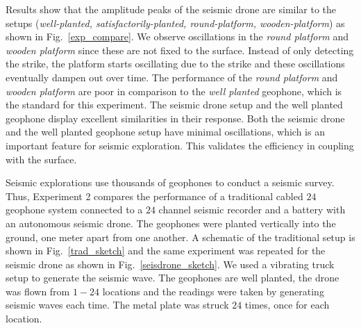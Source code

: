 Results show that the amplitude peaks of the seismic drone are similar to the setups (\emph{well-planted, satisfactorily-planted, round-platform, wooden-platform}) as shown in Fig.~\ref{exp_compare}. We observe oscillations in the \emph{round platform} and \emph{wooden platform} since these are not fixed to the surface. Instead of only detecting the strike, the platform starts oscillating due to the strike and these oscillations eventually dampen out over time. The performance of the \emph{round platform} and \emph{wooden platform} are poor in comparison to the \emph{well planted} geophone, which is the standard for this experiment. The seismic drone setup and the well planted geophone display excellent similarities in their response. Both the seismic drone and the well planted geophone setup have minimal oscillations, which is an important feature for seismic exploration. This validates the efficiency in coupling with the surface.  

Seismic explorations use thousands of geophones to conduct a seismic survey. Thus, Experiment 2 compares the performance of a traditional cabled $24$ geophone system connected to a $24$ channel seismic recorder and a battery with an autonomous seismic drone. The geophones were planted vertically into the ground, one meter apart from one another.  A schematic of the traditional setup is shown in Fig.~\ref{trad_sketch} and the same experiment was repeated for the seismic drone as shown in Fig.~\ref{seisdrone_sketch}. We used a vibrating truck setup to generate the seismic wave. The geophones are well planted, the drone was flown from $1-24$ locations and the readings were taken by generating seismic waves each time. The metal plate was struck $24$ times, once for each location.

